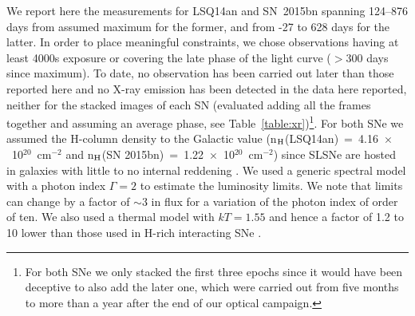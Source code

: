 \documentclass[useAMS,usenatbib]{mn2e}
\def\an{LSQ14an}
\begin{document}
We report here the measurements for \an\/ and SN~2015bn spanning 124--876 days from assumed maximum for the former, and from -27 to 628 days for the latter. In order to place meaningful constraints, we chose observations having at least 4000s exposure or covering the late phase of the light curve ($>$300 days since maximum). To date, no observation has been carried out later than those reported  here and no X-ray emission has been detected in the data here reported, neither for the stacked images of each SN (evaluated adding all the frames together and assuming an average phase, see Table~\ref{table:xr})\footnote{For both SNe we only stacked the first three epochs since it would have been deceptive to also add the later one, which were carried out from five months to more than a year after the end of our optical campaign.}. For both SNe we assumed the H-column density to the Galactic value (n$_{\rm H}$(\an)~=~4.16~$\times$~10$^{20}$~cm$^{-2}$ and n$_{\rm H}$(SN 2015bn)~=~1.22~$\times$~10$^{20}$~cm$^{-2}$) since SLSNe are hosted in galaxies with little to no internal reddening \citep[see][]{lu14,le15,pe16}.  We used a generic spectral model with a photon index $\Gamma=2$ \citep{lev13} to estimate the luminosity limits. We note that limits can change by a factor of $\sim$3 in flux for a variation of the photon index of order of ten. We also used a thermal model with $kT=1.55$  \citep[equal to that used for SCP06F6;][which is the only SLSN detected in X-ray]{lev13} and hence a factor of 1.2 to 10 lower than those used in H-rich interacting SNe \citep[e.g.][]{cha12,of14,cha15}. 
\end{document}
